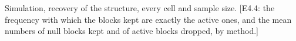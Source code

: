 \begin{table}[t]
\color{colR1}
\caption{Simulation, recovery of the structure, every cell and sample size. [E4.4: the frequency with which the blocks kept are exactly the active ones, and the mean numbers of null blocks kept and of active blocks dropped, by method.]}
\label{tab:sim-structure}
\centering
{}
\end{table}
